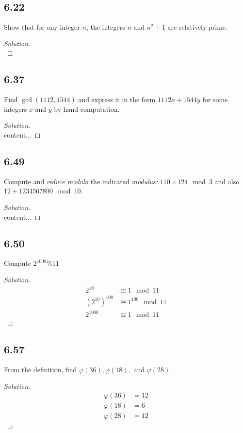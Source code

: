 \documentclass[]{article}
\let\phi\varphi
\newcommand\<{\langle}
\renewcommand\>{\rangle}
\newenvironment{solution}
{
	\begin{proof}[Solution] \text{ }
		\\
	}
	{
	\end{proof}
}
\begin{document}
\subsection*{6.22} Show that for any integer $n$, the integers $n$ and $n^2 + 1$ are relatively prime.
\begin{solution}
	
\end{solution}

\subsection*{6.37} Find $\gcd(1112, 1544)$ and express it in the form $1112x + 1544y$ for some integers $x$ and $y$ by hand computation.
\begin{solution}
	content...
\end{solution}

\subsection*{6.49} Compute and \textit{reduce modulo} the indicated \textit{modulus:} $110 \times 124 \mod 3$ and also $12 + 1234567890 \mod 10$.
\begin{solution}
	content...
\end{solution}

\subsection*{6.50} Compute $2^{1000} \% 11$
\begin{solution}
	\begin{align*}
		2^{10} &\cong 1 \mod 11 \\
		\left(2^{10}\right)^{100} &\cong 1^{100} \mod 11 \\
		2^{1000} &\cong 1 \mod 11
	\end{align*}
\end{solution}

\subsection*{6.57} From the definition, find $\phi(36), \phi(18),$ and $\phi(28)$.
\begin{solution}
	\begin{align*}
		\phi(36) &= 12 \\
		\phi(18) &= 6 \\
		\phi(28) &= 12
	\end{align*}
\end{solution}
\end{document}

